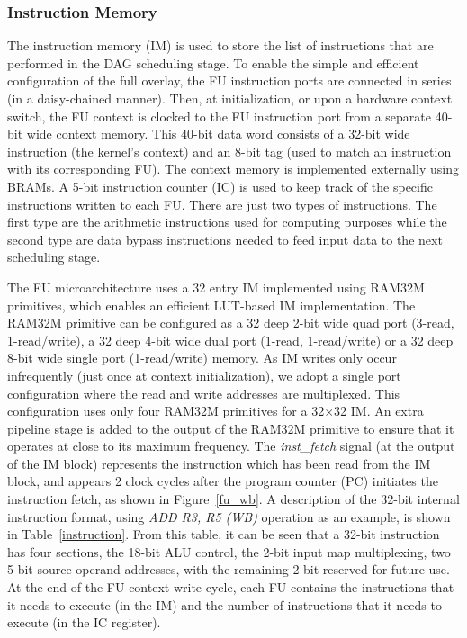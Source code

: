 \subsubsection{Instruction Memory}
The instruction memory (IM) is used to store the list of instructions that are performed in the DAG scheduling stage. 
To enable the simple and efficient configuration of the full overlay, the FU instruction ports are connected in series (in a daisy-chained manner). Then, at initialization, or upon a hardware context switch, the FU context is clocked to the FU instruction port from a separate 40-bit wide context memory. This 40-bit data word consists of a 32-bit wide instruction (the kernel$\mbox{'}$s context) and an 8-bit tag (used to match an instruction with its corresponding FU). The context memory is implemented externally using BRAMs. 
A 5-bit instruction counter (IC) is used to keep track of the specific instructions written to each FU. 
There are just two types of instructions. The first type are the arithmetic instructions used for computing purposes while the second type are data bypass instructions needed to feed input data to the next scheduling stage. 

The FU microarchitecture uses a 32 entry IM implemented using RAM32M primitives, which enables an efficient LUT-based IM implementation.  The RAM32M primitive can be configured as a 32 deep 2-bit wide quad port (3-read, 1-read/write), a 32 deep 4-bit wide dual port (1-read, 1-read/write) or a 32 deep 8-bit wide single port (1-read/write) memory.
As IM writes only occur infrequently (just once at context initialization), we adopt a single port configuration where the read and write addresses are multiplexed. This configuration uses only four RAM32M primitives for a 32$\times$32 IM. 
An extra pipeline stage is added to the output of the RAM32M primitive to ensure that it operates at close to its maximum frequency. 
The \textit{inst\_fetch} signal (at the output of the IM block) represents the instruction which has been read from the IM block, and appears 2 clock cycles after the program counter (PC) initiates the instruction fetch, as shown in Figure~\ref{fu_wb}. 
A description of the 32-bit internal instruction format, using \textit{ADD R3, R5 (WB)} operation as an example, is shown in Table~\ref{instruction}. 
From this table, it can be seen that a 32-bit instruction has four sections, the 18-bit ALU control, the 2-bit input map multiplexing, two 5-bit source operand addresses, with the remaining 2-bit reserved for future use. 
At the end of the FU context write cycle, each FU contains the instructions that it needs to execute (in the IM) and the number of instructions that it needs to execute (in the IC register). 

